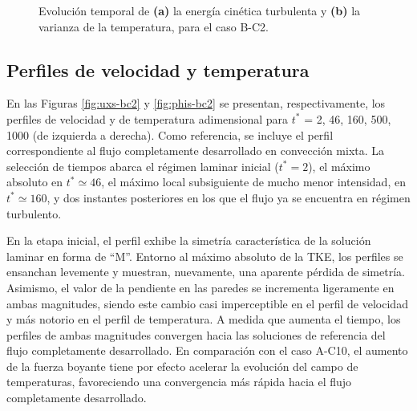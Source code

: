 \begin{figure}[H]
  \centering  
    
  \caption{Evolución temporal de \textbf{(a)} la energía cinética turbulenta y \textbf{(b)} la varianza de la temperatura, para el caso B-C2.}
  \label{fig:bc2-2}
\end{figure}

\subsection{Perfiles de velocidad y temperatura}
En las Figuras \ref{fig:uxs-bc2} y \ref{fig:phis-bc2} se presentan, respectivamente, los perfiles de velocidad y de temperatura adimensional para $t^*$ = 2, 46, 160, 500, 1000 (de izquierda a derecha). Como referencia, se incluye el perfil correspondiente al flujo completamente desarrollado en convección mixta. La selección de tiempos abarca el régimen laminar inicial ($t^* = 2$), el máximo absoluto en $t^* \simeq 46$, el máximo local subsiguiente de mucho menor intensidad, en $t^* \simeq 160$, y dos instantes posteriores en los que el flujo ya se encuentra en régimen turbulento.

En la etapa inicial, el perfil exhibe la simetría característica de la solución laminar en forma de ``M''. Entorno al máximo absoluto de la TKE, los perfiles se ensanchan levemente y muestran, nuevamente, una aparente pérdida de simetría. Asimismo, el valor de la pendiente en las paredes se incrementa ligeramente en ambas magnitudes, siendo este cambio casi imperceptible en el perfil de velocidad y más notorio en el perfil de temperatura. A medida que aumenta el tiempo, los perfiles de ambas magnitudes convergen hacia las soluciones de referencia del flujo completamente desarrollado. En comparación con el caso A-C10, el aumento de la fuerza boyante tiene por efecto acelerar la evolución del campo de temperaturas, favoreciendo una convergencia más rápida hacia el flujo completamente desarrollado.

